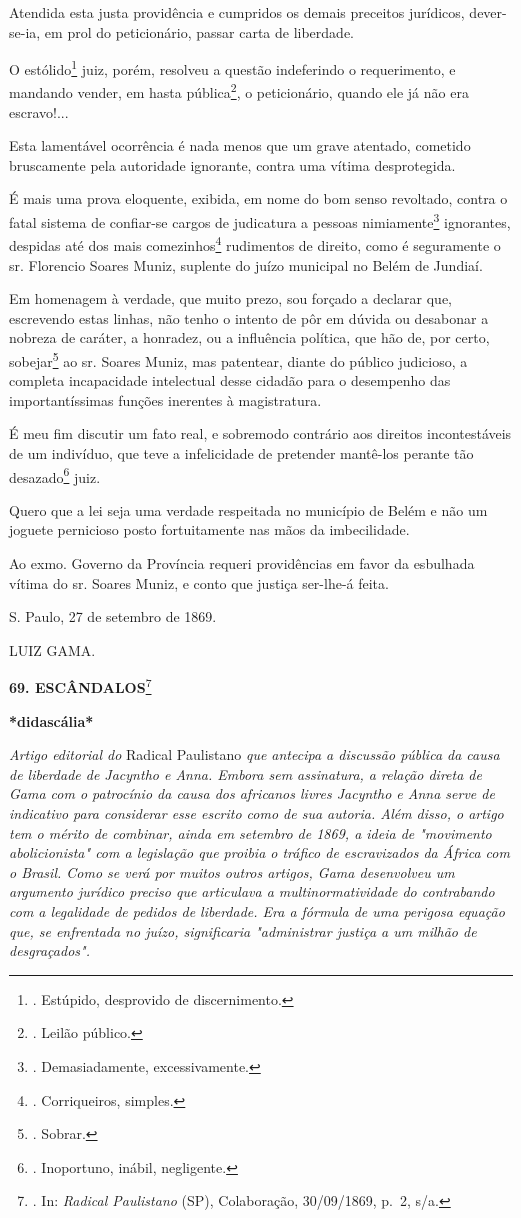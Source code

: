 Atendida esta justa providência e cumpridos os demais preceitos
jurídicos, dever-se-ia, em prol do peticionário, passar carta de
liberdade.

O estólido\footnote{. Estúpido, desprovido de discernimento.} juiz,
porém, resolveu a questão indeferindo o requerimento, e mandando vender,
em hasta pública\footnote{. Leilão público.}, o peticionário, quando ele
já não era escravo!...

Esta lamentável ocorrência é nada menos que um grave atentado, cometido
bruscamente pela autoridade ignorante, contra uma vítima desprotegida.

É mais uma prova eloquente, exibida, em nome do bom senso revoltado,
contra o fatal sistema de confiar-se cargos de judicatura a pessoas
nimiamente\footnote{. Demasiadamente, excessivamente.} ignorantes,
despidas até dos mais comezinhos\footnote{. Corriqueiros, simples.}
rudimentos de direito, como é seguramente o sr. Florencio Soares Muniz,
suplente do juízo municipal no Belém de Jundiaí.

Em homenagem à verdade, que muito prezo, sou forçado a declarar que,
escrevendo estas linhas, não tenho o intento de pôr em dúvida ou
desabonar a nobreza de caráter, a honradez, ou a influência política,
que hão de, por certo, sobejar\footnote{. Sobrar.} ao sr. Soares Muniz,
mas patentear, diante do público judicioso, a completa incapacidade
intelectual desse cidadão para o desempenho das importantíssimas funções
inerentes à magistratura.

É meu fim discutir um fato real, e sobremodo contrário aos direitos
incontestáveis de um indivíduo, que teve a infelicidade de pretender
mantê-los perante tão desazado\footnote{. Inoportuno, inábil,
  negligente.} juiz.

Quero que a lei seja uma verdade respeitada no município de Belém e não
um joguete pernicioso posto fortuitamente nas mãos da imbecilidade.

Ao exmo. Governo da Província requeri providências em favor da esbulhada
vítima do sr. Soares Muniz, e conto que justiça ser-lhe-á feita.

S. Paulo, 27 de setembro de 1869.

LUIZ GAMA.

\textbf{69. ESCÂNDALOS}\footnote{. In: \emph{Radical Paulistano} (SP),
  Colaboração, 30/09/1869, p.~2, s/a.}

\textbf{*didascália*}

\emph{Artigo editorial do} Radical Paulistano \emph{que antecipa a
discussão pública da causa de liberdade de Jacyntho e Anna. Embora sem
assinatura, a relação direta de Gama com o patrocínio da causa dos
africanos livres Jacyntho e Anna serve de indicativo para considerar
esse escrito como de sua autoria. Além disso, o artigo tem o mérito de
combinar, ainda em setembro de 1869, a ideia de "movimento
abolicionista" com a legislação que proibia o tráfico de escravizados da
África com o Brasil. Como se verá por muitos outros artigos, Gama
desenvolveu um argumento jurídico preciso que articulava a
multinormatividade do contrabando com a legalidade de pedidos de
liberdade. Era a fórmula de uma perigosa equação que, se enfrentada no
juízo, significaria "administrar justiça a um milhão de desgraçados".}

